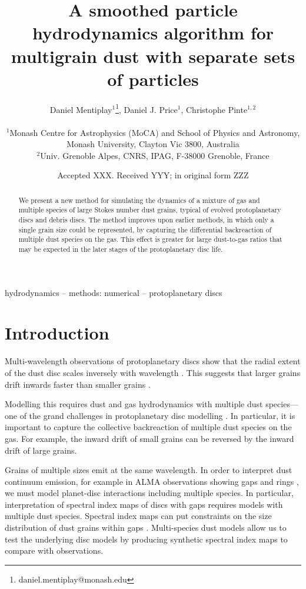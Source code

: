 \documentclass[fleqn,usenatbib]{mnras}
\title[SPH for multigrain dust]{A smoothed particle hydrodynamics algorithm for
multigrain dust with separate sets of particles}
\author[Mentiplay, Price, \& Pinte]{%
   \parbox{\textwidth}{%
      Daniel Mentiplay\(^{1}\)\thanks{daniel.mentiplay@monash.edu},
      Daniel J. Price\(^{1}\),
      Christophe Pinte\(^{1,2}\)
   }\\
   \(^{1}\)Monash Centre for Astrophysics (MoCA) and School of Physics and
   Astronomy, Monash University, Clayton Vic 3800, Australia \\
   \(^{2}\)Univ. Grenoble Alpes, CNRS, IPAG, F-38000 Grenoble, France
}
\date{Accepted XXX. Received YYY; in original form ZZZ}
\begin{document}
\label{firstpage}
\pagerange{\pageref{firstpage}--\pageref{lastpage}}
\maketitle

\begin{abstract}
   We present a new method for simulating the dynamics of a mixture of gas and
   multiple species of large Stokes number dust grains, typical of evolved
   protoplanetary discs and debris discs. The method improves upon earlier
   methods, in which only a single grain size could be represented, by capturing
   the differential backreaction of multiple dust species on the gas. This
   effect is greater for large dust-to-gas ratios that may be expected in the
   later stages of the protoplanetary disc life.
\end{abstract}

\begin{keywords}
hydrodynamics -- methods: numerical -- protoplanetary discs
\end{keywords}



\section{Introduction}

Multi-wavelength observations of protoplanetary discs show that the radial
extent of the dust disc scales inversely with wavelength
\citep{Andrews2015PASP..127..961A}. This suggests that larger grains drift
inwards faster than smaller grains \citep{Weidenschilling1977MNRAS.180...57W}.

Modelling this requires dust and gas hydrodynamics with multiple dust
species---one of the grand challenges in protoplanetary disc modelling
\citep{Haworth2016PASA...33...53H}. In particular, it is important to capture
the collective backreaction of multiple dust species on the gas. For example,
the inward drift of small grains can be reversed by the inward drift of large
grains.

Grains of multiple sizes emit at the same wavelength. In order to interpret dust
continuum emission, for example in ALMA observations showing gaps and rings
\citep{ALMAPartnership2015ApJ...808L...3A, Andrews2016ApJ...820L..40A}, we must
model planet-disc interactions including multiple species. In particular,
interpretation of spectral index maps of discs with gaps requires models with
multiple dust species. Spectral index maps can put constraints on the size
distribution of dust grains within gaps \citep{Huang2018ApJ...852..122H}.
Multi-species dust models allow us to test the underlying disc models by
producing synthetic spectral index maps to compare with observations.
\end{document}
